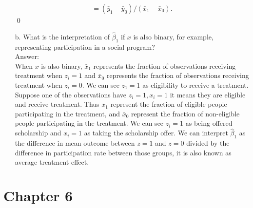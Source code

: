 \documentclass[10pt]{article}
\begin{document}
\begin{enumerate}
\begin{align*}
    &=(\bar{y}_1-\bar{y}_0)/(\bar{x}_1-\bar{x}_0). &
\end{align*}\qed
\item[b.] What is the interpretation of $\hat{\beta}_1$ if $x$ is also binary, for example, representing participation in a social program?
\\ Answer:\\
When $x$ is also binary, $\bar{x}_1$ represents the fraction of observations receiving treatment when $z_i=1$ and $\bar{x}_0$ represents the fraction of observations receiving treatment when $z_i=0$. We can see $z_1=1$ as eligibility to receive a treatment. Suppose one of the observations have $z_i=1,x_i=1$ it means they are eligible and receive treatment. Thus $\bar{x}_1$ represent the fraction of eligible people participating in the treatment, and $\bar{x}_0$ represent the fraction of non-eligible people participating in the treatment. We can see $z_i=1$ as being offered scholarship and $x_i=1$ as taking the scholarship offer. We can interpret $\hat{\beta}_1$ as the difference in mean outcome between $z=1$ and $z=0$ divided by the difference in participation rate between those groups, it is also known as average treatment effect.
\end{enumerate}

\section*{Chapter 6}
\end{document}
